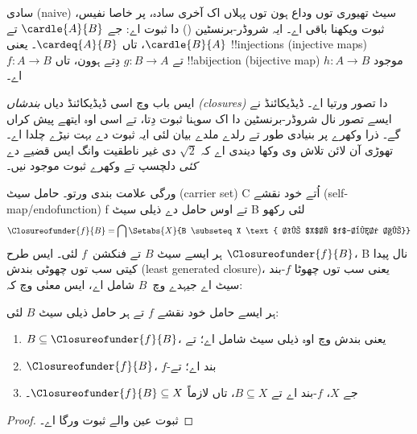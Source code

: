 \documentclass[../../../include/open-logic-section]{subfiles}
\begin{document}


سادی (naive) سیٹ تھیوری توں وداع ہون توں پہلاں اک آخری سادہ، پر خاصا
نفیس، ثبوت ویکھنا باقی اے۔ ایہ شروڈر-برنسٹین
() دا ثبوت اے: جے
$\cardle{A}{B}$ تے $\cardle{B}{A}$، تاں $\cardeq{A}{B}$۔ یعنی
!!{injection}s (injective maps) $f \colon A \to B$ تے
$g \colon B \to A$ دِتے ہوون، تاں !!a{bijection} (bijective map)
$h \colon A \to B$ موجود اے۔

ایس باب وچ اسی ڈیڈیکائنڈ دیاں \emph{بندشاں (closures)} دا تصور ورتیا
اے۔ ڈیڈیکائنڈ نے ایسے تصور نال شروڈر-برنسٹین دا اک سوہنا ثبوت دِتا،
تے اسی اوہ ایتھے پیش کراں گے۔ ذرا وکھرے پر بنیادی طور تے رلدے ملدے
بیان لئی ایہ ثبوت \citet[pp.~157--8]{Potter2004} دے بہت نیڑے چلدا اے۔
تھوڑی آن لائن تلاش وی وکھا دیندی اے کہ $\sqrt{2}$ دی غیر ناطقیت وانگ
ایس قضیے دے \emph{کئی} دلچسپ تے وکھرے ثبوت موجود نیں۔

 ورگی علامت بندی ورتو۔ حامل
سیٹ (carrier set) C اُتے خود نقشے (self-map/endofunction) f تے اوس
حامل دے ذیلی سیٹ B لئی رکھو
\[
\Closureofunder{f}{B} = \bigcap \Setabs{X}{B \subseteq X
\text{ تے $X$، $f$-بند اے}}
\]
ہر ایسے سیٹ $B$ تے فنکشن~$f$ لئی۔ ایس طرح
$\Closureofunder{f}{B}$، B نال پیدا کیتی سب توں چھوٹی بندش (least
generated closure)، یعنی سب توں چھوٹا $f$-بند سیٹ اے جیہدے وچ~$B$
شامل اے، ایس معنٰی وچ کہ:

\begin{lem}
	ہر ایسے حامل خود نقشے $f$ تے ہر حامل ذیلی سیٹ $B$ لئی:
	\begin{enumerate}
		\item{} $B \subseteq \Closureofunder{f}{B}$، یعنی بندش وچ اوہ ذیلی سیٹ شامل اے؛ تے
		\item{} $\Closureofunder{f}{B}$، $f$-بند اے؛ تے
		\item{} جے $X$، $f$-بند اے تے $B
		\subseteq X$، تاں لازماً $\Closureofunder{f}{B} \subseteq X$۔
	\end{enumerate}
\end{lem}

\begin{proof}
ثبوت عین  والے ثبوت
ورگا اے۔
\end{proof}
\end{document}
